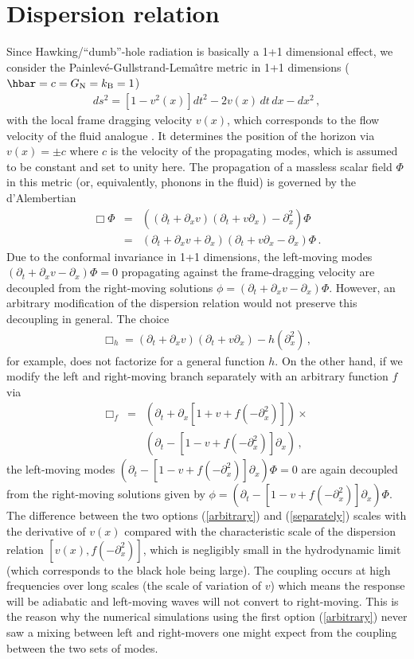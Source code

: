 \documentclass[12pt,aps,prl,showpacs,amssymb,nofootinbib,onecolumn]{revtex4-2}
\newcommand{\nn}{\nonumber\\}
\newcommand{\bea}{\begin{eqnarray}}
\newcommand{\ea}{\end{eqnarray}}
\begin{document}
\section{Dispersion relation}\quad
%
Since Hawking/``dumb''-hole radiation is basically a 1+1 dimensional
effect, we consider the Painlev{\'e}-Gullstrand-Lema{\^\i}tre metric 
in 1+1 dimensions ($\hbar=c=G_{\rm N}=k_{\rm B}=1$)
%
\bea
ds^2=\left[1-v^2(x)\right]dt^2-2v(x)\,dt\,dx-dx^2
\,,
\ea
%
with the local frame dragging velocity $v(x)$, which
corresponds to the flow velocity of the fluid analogue
\cite{unruh-prl}.  
%
It determines the position of the horizon via $v(x)=\pm c$ where $c$
is the velocity of the propagating modes, which is assumed to be
constant and set to unity here. 
%
The propagation of a massless scalar field $\Phi$ in this metric 
(or, equivalently, phonons in the fluid) is governed by the
d'Alembertian  
%
\bea
\label{box}
\Box\Phi
&=&
\left((\partial_t+\partial_xv)(\partial_t+v\partial_x)-\partial_x^2\right)
\Phi
\nn
&=&
(\partial_t+\partial_xv+\partial_x)(\partial_t+v\partial_x-\partial_x)\Phi 
\,.
\ea
%
Due to the conformal invariance in 1+1 dimensions, the left-moving modes 
$(\partial_t+\partial_xv-\partial_x)\Phi=0$ propagating against the 
frame-dragging velocity are decoupled from the right-moving solutions 
$\phi=(\partial_t+\partial_xv-\partial_x)\Phi$.
%
However, an arbitrary modification of the dispersion relation would
not preserve this decoupling in general. 
%
The choice 
%
\bea
\label{arbitrary}
\Box_h
=
(\partial_t+\partial_xv)(\partial_t+v\partial_x)-
h(\partial_x^2) 
\,,
\ea
%
for example, does not factorize for a general function $h$. 
%
On the other hand, if we modify the left and right-moving branch 
separately with an arbitrary function $f$ via 
%
\bea
\label{separately}
\Box_f
&=&
\left(\partial_t+\partial_x[1+v+f(-\partial_x^2)]\right)
\times
\nn
&&
\left(\partial_t-[1-v+f(-\partial_x^2)]\partial_x\right)
\,,
\ea
%
the left-moving modes 
$(\partial_t-[1-v+f(-\partial_x^2)]\partial_x)\Phi=0$
are again decoupled from the right-moving solutions given by 
$\phi=(\partial_t-[1-v+f(-\partial_x^2)]\partial_x)\Phi$.  
%
The difference between the two options (\ref{arbitrary}) and 
(\ref{separately}) scales with the derivative of $v(x)$ compared with
the characteristic scale of the dispersion relation 
$[v(x),f(-\partial_x^2)]$, which is negligibly small in the
hydrodynamic limit (which corresponds to the black hole being large). 
The coupling occurs %
at high frequencies over long scales (the scale of variation of $v$)
which means the response will be adiabatic and left-moving waves will
not convert to right-moving.  
%
This is the reason why the numerical simulations using the first
option (\ref{arbitrary}) never saw a mixing between left and
right-movers one might expect from the coupling between the two sets
of modes.  
\end{document}
